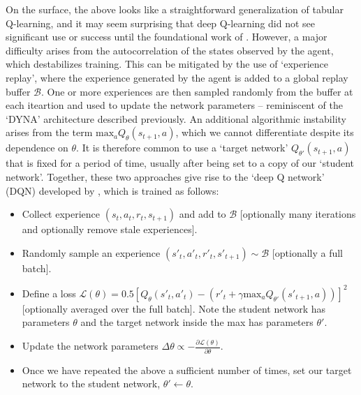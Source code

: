 On the surface, the above looks like a straightforward generalization of tabular Q-learning, and it may seem surprising that deep Q-learning did not see significant use or success until the foundational work of \citet{mnih2013playing}.
However, a major difficulty arises from the autocorrelation of the states observed by the agent, which destabilizes training.
This can be mitigated by the use of `experience replay', where the experience generated by the agent is added to a global replay buffer $\mathcal{B}$.
One or more experiences are then sampled randomly from the buffer at each iteartion and used to update the network parameters -- reminiscent of the `DYNA' architecture described previously.
An additional algorithmic instability arises from the term $\text{max}_a Q_\theta(s_{t+1}, a)$, which we cannot differentiate despite its dependence on $\theta$.
It is therefore common to use a `target network' $Q_{\theta'}(s_{t+1}, a)$ that is fixed for a period of time, usually after being set to a copy of our `student network'.
Together, these two approaches give rise to the `deep Q network' (DQN) developed by \citet{mnih2013playing}, which is trained as follows:
\begin{itemize}
    \item Collect experience $(s_t, a_t, r_t, s_{t+1})$ and add to $\mathcal{B}$ [optionally many iterations and optionally remove stale experiences].
    \item Randomly sample an experience $(s'_t, a'_t, r'_t, s'_{t+1}) \sim \mathcal{B}$ [optionally a full batch].
    \item Define a loss $\mathcal{L}(\theta) = 0.5 [ Q_\theta(s'_t, a'_t) - (r'_t + \gamma \text{max}_a Q_{\theta'}(s'_{t+1}, a)) ]^2 $ [optionally averaged over the full batch]. Note the student network has parameters $\theta$ and the target network inside the max has parameters $\theta'$.
    \item Update the network parameters $\Delta \theta \propto - \frac{\partial \mathcal{L}(\theta)}{\partial \theta}$.
    \item Once we have repeated the above a sufficient number of times, set our target network to the student network, $\theta' \leftarrow \theta$.
\end{itemize}
